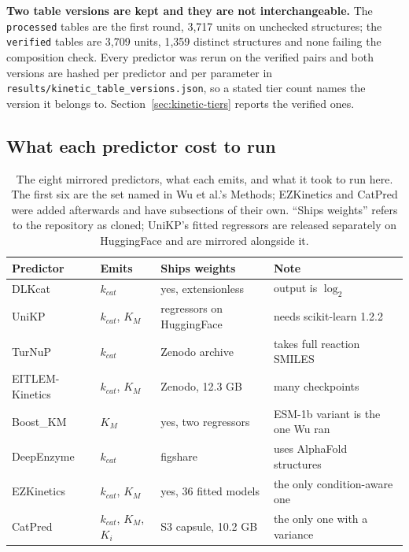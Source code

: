 \textbf{Two table versions are kept and they are not interchangeable.} The \texttt{processed}
tables are the first round, 3{,}717 units on unchecked structures; the \texttt{verified}
tables are 3{,}709 units, 1{,}359 distinct structures and none failing the composition
check. Every predictor was rerun on the verified pairs and both versions are hashed per
predictor and per parameter in \texttt{results/kinetic\_table\_versions.json}, so a stated
tier count names the version it belongs to. Section~\ref{sec:kinetic-tiers} reports the
verified ones.

\subsection{What each predictor cost to run}

\begin{table}[!htbp]
  \centering
  \footnotesize
  \caption[Predictor status]{The eight mirrored predictors, what each emits, and what it
  took to run here. The first six are the set named in Wu et al.'s Methods; EZKinetics and
  CatPred were added afterwards and have subsections of their own. ``Ships weights'' refers
  to the repository as cloned; UniKP's fitted regressors are released separately on
  HuggingFace and are mirrored alongside it.}
  \label{tab:predictors}
  \begin{tabular}{llll}
    \hline
    Predictor & Emits & Ships weights & Note \\
    \hline
    DLKcat & $k_{cat}$ & yes, extensionless & output is $\log_2$ \\
    UniKP & $k_{cat}$, $K_M$ & regressors on HuggingFace & needs scikit-learn 1.2.2 \\
    TurNuP & $k_{cat}$ & Zenodo archive & takes full reaction SMILES \\
    EITLEM-Kinetics & $k_{cat}$, $K_M$ & Zenodo, 12.3 GB & many checkpoints \\
    Boost\_KM & $K_M$ & yes, two regressors & ESM-1b variant is the one Wu ran \\
    DeepEnzyme & $k_{cat}$ & figshare & uses AlphaFold structures \\
    EZKinetics & $k_{cat}$, $K_M$ & yes, 36 fitted models & the only condition-aware one \\
    CatPred & $k_{cat}$, $K_M$, $K_i$ & S3 capsule, 10.2 GB & the only one with a variance \\
    \hline
  \end{tabular}
\end{table}

